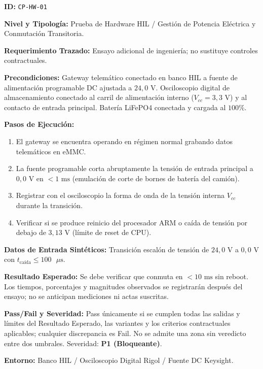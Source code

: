 \par\noindent\textbf{ID:} \texttt{C\allowbreak{}P\allowbreak{}-\allowbreak{}H\allowbreak{}W\allowbreak{}-\allowbreak{}0\allowbreak{}1\allowbreak{}}\par
\par\noindent\textbf{Nivel y Tipología:} Prueba de Hardware HIL / Gestión de Potencia Eléctrica y Conmutación Transitoria.\par
\par\noindent\textbf{Requerimiento Trazado:} Ensayo adicional de ingeniería; no sustituye controles contractuales.\par
\par\noindent\textbf{Precondiciones:} Gateway telemático conectado en banco HIL a fuente de alimentación programable DC ajustada a \(24{,}0\text{ V}\). Osciloscopio digital de almacenamiento conectado al carril de alimentación interno (\(V_{cc} = 3{,}3\text{ V}\)) y al contacto de entrada principal. Batería LiFePO4 conectada y cargada al \(100\%\).\par
\par\noindent\textbf{Pasos de Ejecución:} \par
\begin{enumerate}
\item El gateway se encuentra operando en régimen normal grabando datos telemáticos en eMMC.
\item La fuente programable corta abruptamente la tensión de entrada principal a \(0{,}0\text{ V}\) en \(< 1\text{ ms}\) (emulación de corte de bornes de batería del camión).
\item Registrar con el osciloscopio la forma de onda de la tensión interna \(V_{cc}\) durante la transición.
\item Verificar si se produce reinicio del procesador ARM o caída de tensión por debajo de \(3{,}13\text{ V}\) (límite de reset de CPU).
\end{enumerate}
\par\noindent\textbf{Datos de Entrada Sintéticos:} Transición escalón de tensión de \(24{,}0\text{ V}\) a \(0{,}0\text{ V}\) con \(t_{\mbox{caída}} \le 100\text{ }\mu\text{s}\).\par
\par\noindent\textbf{Resultado Esperado:} Se debe verificar que conmuta en \(< 10\text{ ms}\) sin reboot. Los tiempos, porcentajes y magnitudes observados se registrarán después del ensayo; no se anticipan mediciones ni actas suscritas.\par
\par\noindent\textbf{Pass/Fail y Severidad:} Pass únicamente si se cumplen todas las salidas y límites del Resultado Esperado, las variantes y los criterios contractuales aplicables; cualquier discrepancia es Fail. No se admite una zona sin veredicto entre dos umbrales. Severidad: \textbf{P1 (Bloqueante)}.\par
\par\noindent\textbf{Entorno:} Banco HIL / Osciloscopio Digital Rigol / Fuente DC Keysight.\par






